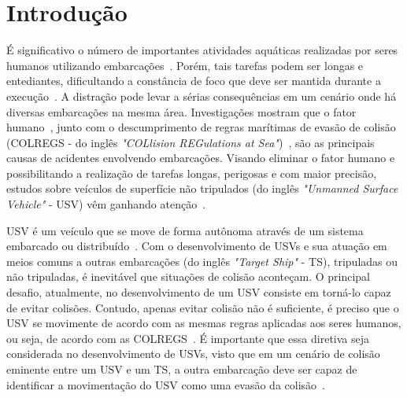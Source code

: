 


\chapter{Introdução}\label{chap1:intro}
    É significativo o número de importantes atividades aquáticas realizadas por seres humanos utilizando embarcações~\cite{LIU201671}. Porém, tais tarefas podem ser longas e entediantes, dificultando a constância de foco que deve ser mantida durante a execução~\cite{JURAK2020}. A distração pode levar a sérias consequências em um cenário onde há diversas embarcações na mesma área. Investigações mostram que o fator humano~\cite{HUANG2020451}, junto com o descumprimento de regras marítimas de evasão de colisão (COLREGS - do inglês \textit{"COLlision REGulations at Sea"})~\cite{JURAK2020}, são as principais causas de acidentes envolvendo embarcações.
    Visando eliminar o fator humano e possibilitando a realização de tarefas longas, perigosas e com maior precisão, estudos sobre veículos de superfície não tripulados (do inglês \textit{"Unmanned Surface Vehicle"} - USV) vêm ganhando atenção~\cite{LIU201671}.
    
    USV é um veículo que se move de forma autônoma através de um sistema embarcado ou distribuído~\cite{SONG2018351}. Com o desenvolvimento de USVs e sua atuação em meios comuns a outras embarcações (do inglês \textit{"Target Ship"} - TS), tripuladas ou não tripuladas, é inevitável que situações de colisão aconteçam. O principal desafio, atualmente, no desenvolvimento de um USV consiste em torná-lo capaz de evitar colisões. Contudo, apenas evitar colisão não é suficiente, é preciso que o USV se movimente de acordo com as mesmas regras aplicadas aos seres humanos, ou seja, de acordo com as COLREGS~\cite{COLREGS}. É importante que essa diretiva seja considerada no desenvolvimento de USVs, visto que em um cenário de colisão eminente entre um USV e um TS, a outra embarcação deve ser capaz de identificar a movimentação do USV como uma evasão da colisão~\cite{KUWATA2014110}.
    

